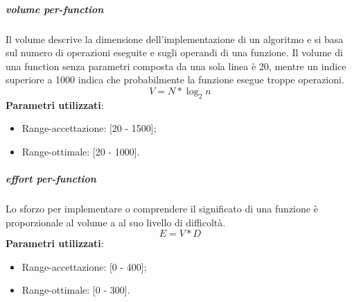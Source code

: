 			\subparagraph{ volume per-function}
			Il volume descrive la dimensione dell'implementazione di un algoritmo e si basa sul numero di operazioni eseguite e sugli operandi di una funzione. Il volume di una function senza parametri composta da una sola linea è 20, mentre un indice superiore a 1000 indica che probabilmente la funzione esegue troppe operazioni.
			\[
			 V = N * \log_{2}n
			\]
			\textbf{Parametri utilizzati}:
			\begin{itemize}
				\item Range-accettazione: [20 - 1500];
				\item Range-ottimale: [20 - 1000].
			\end{itemize}

			
			\subparagraph{ effort per-function}
			Lo sforzo per implementare o comprendere il significato di una funzione è proporzionale al volume a al suo livello di difficoltà.
			 \[
			 E = V * D
			\]
			\textbf{Parametri utilizzati}:
			\begin{itemize}
				\item Range-accettazione: [0 - 400];
				\item Range-ottimale: [0 - 300].
			\end{itemize}

			

